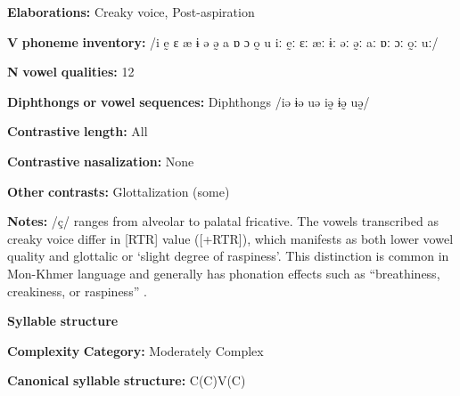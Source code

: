 \begin{styleBody}
\textbf{Elaborations:} Creaky voice, Post-aspiration
\end{styleBody}

\begin{styleBody}
\textbf{V} \textbf{phoneme} \textbf{inventory:} /i ḛ ɛ æ ɨ ə ə̰ a ɒ ɔ o̰ u iː ḛː ɛː æː ɨː əː ə̰ː aː ɒː ɔː o̰ː uː/
\end{styleBody}

\begin{styleBody}
\textbf{N} \textbf{vowel} \textbf{qualities:} 12
\end{styleBody}

\begin{styleBody}
\textbf{Diphthongs} \textbf{or} \textbf{vowel} \textbf{sequences:} Diphthongs /iə ɨə uə iə̰ ɨə̰ uə̰/
\end{styleBody}

\begin{styleBody}
\textbf{Contrastive} \textbf{length:} All
\end{styleBody}

\begin{styleBody}
\textbf{Contrastive} \textbf{nasalization:} None
\end{styleBody}

\begin{styleBody}
\textbf{Other} \textbf{contrasts:} Glottalization (some)
\end{styleBody}

\begin{styleBody}
\textbf{Notes:} /ç/ ranges from alveolar to palatal fricative. The vowels transcribed as creaky voice differ in [RTR] value ([+RTR]), which manifests as both lower vowel quality and glottalic or ‘slight degree of raspiness’. This distinction is common in Mon-Khmer language and generally has phonation effects such as “breathiness, creakiness, or raspiness” \citep[14]{Alves2006}.
\end{styleBody}

\begin{styleBody}
\textbf{Syllable} \textbf{structure}
\end{styleBody}

\begin{styleBody}
\textbf{Complexity} \textbf{Category:} Moderately Complex
\end{styleBody}

\begin{styleBody}
\textbf{Canonical} \textbf{syllable} \textbf{structure:} C(C)V(C) \citep[17-21]{Alves2006}
\end{styleBody}

